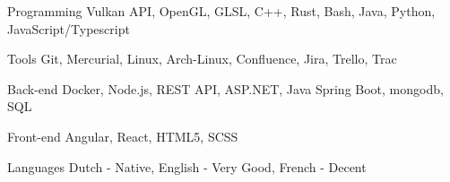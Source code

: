 

\begin{cvskills}

  \cvskill
    {Programming} %
    {Vulkan API, OpenGL, GLSL, C++, Rust, Bash, Java, Python, JavaScript/Typescript} %


  \cvskill
    {Tools} %
    {Git, Mercurial, Linux, Arch-Linux, Confluence, Jira, Trello, Trac} %

  \cvskill
    {Back-end} %
    {Docker, Node.js, REST API, ASP.NET, Java Spring Boot, mongodb, SQL} %

  \cvskill
    {Front-end} %
    {Angular, React, HTML5, SCSS} %

  \cvskill
    {Languages} %
	{Dutch - Native, English - Very Good, French - Decent} %

\end{cvskills}

